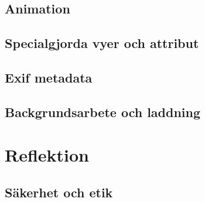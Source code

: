 \documentclass[11px, a4paper]{article}
\begin{document}
\subsection{Animation}

\subsection{Specialgjorda vyer och attribut}

\subsection{Exif metadata}

\subsection{Backgrundsarbete och laddning}


\section{Reflektion}

\subsection{Säkerhet och etik}



\begingroup
\raggedright


\endgroup
\end{document}
